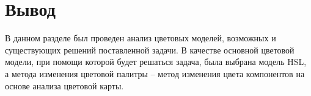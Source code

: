 \section*{Вывод}

В данном разделе был проведен анализ цветовых моделей, возможных и существующих решений поставленной задачи. В качестве основной цветовой модели, при помощи которой будет решаться задача, была выбрана модель HSL, а метода изменения цветовой палитры -- метод изменения цвета компонентов на основе анализа цветовой карты.